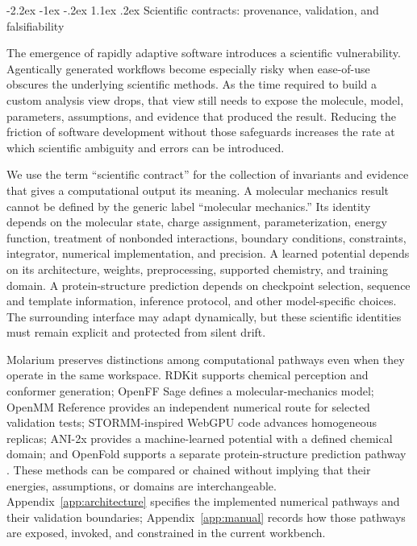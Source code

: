 \documentclass[11pt]{article}
\makeatletter
\renewcommand\section{\@startsection{section}{1}{\z@}%
  {-2.2ex \@plus -1ex \@minus -.2ex}%
  {1.1ex \@plus .2ex}%
  {\normalfont\Large\bfseries\color{molblue}}}
\makeatother
\begin{document}
\section{Scientific contracts: provenance, validation, and falsifiability}

The emergence of rapidly adaptive software introduces a scientific vulnerability. Agentically generated workflows become especially risky when ease-of-use obscures the underlying scientific methods. As the time required to build a custom analysis view drops, that view still needs to expose the molecule, model, parameters, assumptions, and evidence that produced the result. Reducing the friction of software development without those safeguards increases the rate at which scientific ambiguity and errors can be introduced.

We use the term ``scientific contract'' for the collection of invariants and evidence that gives a computational output its meaning. A molecular mechanics result cannot be defined by the generic label ``molecular mechanics.'' Its identity depends on the molecular state, charge assignment, parameterization, energy function, treatment of nonbonded interactions, boundary conditions, constraints, integrator, numerical implementation, and precision. A learned potential depends on its architecture, weights, preprocessing, supported chemistry, and training domain. A protein-structure prediction depends on checkpoint selection, sequence and template information, inference protocol, and other model-specific choices. The surrounding interface may adapt dynamically, but these scientific identities must remain explicit and protected from silent drift.

Molarium preserves distinctions among computational pathways even when they operate in the same workspace. RDKit supports chemical perception and conformer generation; OpenFF Sage defines a molecular-mechanics model; OpenMM Reference provides an independent numerical route for selected validation tests; STORMM-inspired WebGPU code advances homogeneous replicas; ANI-2x provides a machine-learned potential with a defined chemical domain; and OpenFold supports a separate protein-structure prediction pathway \citep{riniker2015etkdg,boothroyd2023sage,eastman2024openmm8,cerutti2024stormm,devereux2020ani2x,ahdritz2024openfold}. These methods can be compared or chained without implying that their energies, assumptions, or domains are interchangeable. Appendix~\ref{app:architecture} specifies the implemented numerical pathways and their validation boundaries; Appendix~\ref{app:manual} records how those pathways are exposed, invoked, and constrained in the current workbench.
\end{document}

